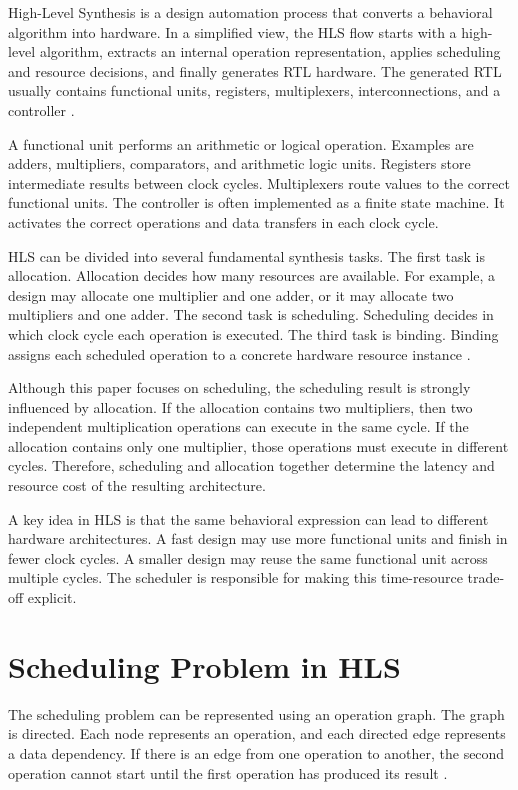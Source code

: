 \documentclass[conference]{IEEEtran}
\begin{document}
	High-Level Synthesis is a design automation process that converts a behavioral algorithm into hardware. In a simplified view, the HLS flow starts with a high-level algorithm, extracts an internal operation representation, applies scheduling and resource decisions, and finally generates RTL hardware. The generated RTL usually contains functional units, registers, multiplexers, interconnections, and a controller \cite{demicheli,cong}.
	
	A functional unit performs an arithmetic or logical operation. Examples are adders, multipliers, comparators, and arithmetic logic units. Registers store intermediate results between clock cycles. Multiplexers route values to the correct functional units. The controller is often implemented as a finite state machine. It activates the correct operations and data transfers in each clock cycle.
	
	HLS can be divided into several fundamental synthesis tasks. The first task is allocation. Allocation decides how many resources are available. For example, a design may allocate one multiplier and one adder, or it may allocate two multipliers and one adder. The second task is scheduling. Scheduling decides in which clock cycle each operation is executed. The third task is binding. Binding assigns each scheduled operation to a concrete hardware resource instance \cite{teich,demicheli}.
	
	Although this paper focuses on scheduling, the scheduling result is strongly influenced by allocation. If the allocation contains two multipliers, then two independent multiplication operations can execute in the same cycle. If the allocation contains only one multiplier, those operations must execute in different cycles. Therefore, scheduling and allocation together determine the latency and resource cost of the resulting architecture.
	
	A key idea in HLS is that the same behavioral expression can lead to different hardware architectures. A fast design may use more functional units and finish in fewer clock cycles. A smaller design may reuse the same functional unit across multiple cycles. The scheduler is responsible for making this time-resource trade-off explicit.
	
	\section{Scheduling Problem in HLS}
	
	The scheduling problem can be represented using an operation graph. The graph is directed. Each node represents an operation, and each directed edge represents a data dependency. If there is an edge from one operation to another, the second operation cannot start until the first operation has produced its result \cite{demicheli,teich}.
	
\end{document}
